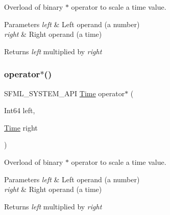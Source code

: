 Overload of binary $\ast$ operator to scale a time value. 


\begin{DoxyParams}{Parameters}
{\em left} & Left operand (a number) \\
\hline
{\em right} & Right operand (a time)\\
\hline
\end{DoxyParams}
\begin{DoxyReturn}{Returns}
{\itshape left} multiplied by {\itshape right} \begin{DoxyVerb}\end{DoxyVerb}
 
\end{DoxyReturn}
\mbox{\label{classsf_1_1_time_a40a6d0938fb4a43731d54fd90bfc6476}} 
\subsubsection{\texorpdfstring{operator$\ast$()}{operator*()}\hspace{0.1cm}{\footnotesize\ttfamily [4/4]}}
{\footnotesize\ttfamily S\+F\+M\+L\+\_\+\+S\+Y\+S\+T\+E\+M\+\_\+\+A\+PI \mbox{\hyperlink{classsf_1_1_time}{Time}} operator$\ast$ (\begin{DoxyParamCaption}\item[{Int64}]{left,  }\item[{\mbox{\hyperlink{classsf_1_1_time}{Time}}}]{right }\end{DoxyParamCaption})\hspace{0.3cm}{\ttfamily [related]}}



Overload of binary $\ast$ operator to scale a time value. 


\begin{DoxyParams}{Parameters}
{\em left} & Left operand (a number) \\
\hline
{\em right} & Right operand (a time)\\
\hline
\end{DoxyParams}
\begin{DoxyReturn}{Returns}
{\itshape left} multiplied by {\itshape right} \begin{DoxyVerb}\end{DoxyVerb}
 
\end{DoxyReturn}
\mbox{\label{classsf_1_1_time_a8996b6a6fcb8f3854b486b8e43949b50}} 
